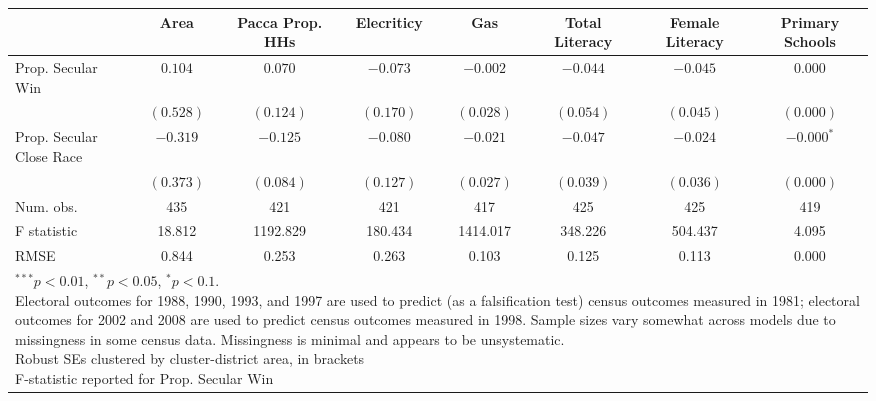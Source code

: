 
\begin{tabular}{l c c c c c c c }
\hline
 & Area & Pacca Prop. HHs & Elecriticy & Gas & Total Literacy & Female Literacy & Primary Schools \\
\hline
Prop. Secular Win        & $0.104$   & $0.070$   & $-0.073$  & $-0.002$  & $-0.044$  & $-0.045$  & $0.000$      \\
                         & $(0.528)$ & $(0.124)$ & $(0.170)$ & $(0.028)$ & $(0.054)$ & $(0.045)$ & $(0.000)$    \\
Prop. Secular Close Race & $-0.319$  & $-0.125$  & $-0.080$  & $-0.021$  & $-0.047$  & $-0.024$  & $-0.000^{*}$ \\
                         & $(0.373)$ & $(0.084)$ & $(0.127)$ & $(0.027)$ & $(0.039)$ & $(0.036)$ & $(0.000)$    \\
\hline
Num. obs.                & 435       & 421       & 421       & 417       & 425       & 425       & 419          \\
F statistic              & 18.812    & 1192.829  & 180.434   & 1414.017  & 348.226   & 504.437   & 4.095        \\
RMSE                     & 0.844     & 0.253     & 0.263     & 0.103     & 0.125     & 0.113     & 0.000        \\
\hline
\multicolumn{8}{l}{\scriptsize{\parbox{.8\linewidth}{\vspace{2pt}$^{***}p<0.01$, $^{**}p<0.05$, $^*p<0.1$. \\
       Electoral outcomes for 1988, 1990, 1993, and 1997 are used to predict (as a falsiﬁcation test) census outcomes measured in
1981; electoral outcomes for 2002 and 2008 are used to predict census outcomes measured in 1998. Sample sizes vary somewhat
across models due to missingness in some census data. Missingness is minimal and appears to be unsystematic.\\
       Robust SEs clustered by cluster-district area, in brackets\\ F-statistic reported for Prop. Secular Win}}}
\end{tabular}

